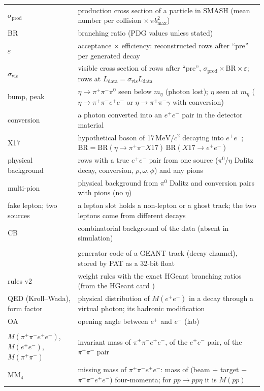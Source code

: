 \documentclass[11pt,a4paper]{article}
\newcommand{\pip}{\ensuremath{\pi^{+}}\xspace}
\newcommand{\pim}{\ensuremath{\pi^{-}}\xspace}
\newcommand{\piz}{\ensuremath{\pi^{0}}\xspace}
\newcommand{\ee}{\ensuremath{e^{+}e^{-}}\xspace}
\newcommand{\pipi}{\ensuremath{\pi^{+}\pi^{-}}\xspace}
\newcommand{\ppee}{\ensuremath{\pi^{+}\pi^{-}e^{+}e^{-}}\xspace}
\newcommand{\Mfour}{\ensuremath{M(\pi^{+}\pi^{-}e^{+}e^{-})}\xspace}
\newcommand{\Mee}{\ensuremath{M(e^{+}e^{-})}\xspace}
\newcommand{\Mpipi}{\ensuremath{M(\pi^{+}\pi^{-})}\xspace}
\newcommand{\MeVcc}{\ensuremath{\mathrm{MeV}/c^{2}}\xspace}
\newcommand{\Ldata}{\ensuremath{L_{\mathrm{data}}}\xspace}
\newcommand{\code}[1]{\texttt{\detokenize{#1}}}
\begin{document}
{\begin{longtable}{@{}>{\raggedright\arraybackslash}p{3.3cm} >{\raggedright\arraybackslash}p{\dimexpr\textwidth-3.3cm-2\tabcolsep\relax}@{}}
$\sigma_{\mathrm{prod}}$ & production cross section of a particle in SMASH (mean number per collision $\times\,\pi b_{\max}^2$) \\
BR & branching ratio (PDG values unless stated) \\
$\varepsilon$ & acceptance $\times$ efficiency: reconstructed rows after ``pre'' per generated decay \\
$\sigma_{\mathrm{vis}}$ & visible cross section of rows after ``pre'', $\sigma_{\mathrm{prod}}\times\mathrm{BR}\times\varepsilon$; rows at \Ldata $=\sigma_{\mathrm{vis}}\Ldata$ \\
bump, peak & $\eta\to\pipi\piz$ seen below $m_\eta$ (photon lost); $\eta$ seen at $m_\eta$ ($\eta\to\ppee$ or $\eta\to\pipi\gamma$ with conversion) \\
conversion & a photon converted into an \ee pair in the detector material \\
X17 & hypothetical boson of 17\,\MeVcc decaying into \ee; $\mathrm{BR} = \mathrm{BR}(\eta\to\pipi X17)\,\mathrm{BR}(X17\to\ee)$ \\
physical background & rows with a true \ee pair from one source (\piz/$\eta$ Dalitz decay, conversion, $\rho,\omega,\phi$) and any pions \\
multi-pion & physical background from \piz Dalitz and conversion pairs with pions (no $\eta$) \\
fake lepton; two sources & a lepton slot holds a non-lepton or a ghost track; the two leptons come from different decays \\
CB & combinatorial background of the data (absent in simulation) \\
\midrule
\multicolumn{2}{@{}l}{\textbf{Corrections}} \\
\code{geninfo} & generator code of a GEANT track (decay channel), stored by PAT as a 32-bit float \\
rules v2 & weight rules with the exact HGeant branching ratios (from the HGeant card \code{ETA}) \\
QED (Kroll--Wada), form factor & physical distribution of \Mee in a decay through a virtual photon; its hadronic modification \\
OA & opening angle between $e^+$ and $e^-$ (lab) \\
\midrule
\multicolumn{2}{@{}l}{\textbf{Kinematic variables and cuts}} \\
\Mfour, \Mee, \Mpipi & invariant mass of \ppee, of the \ee pair, of the \pipi pair \\
$\mathrm{MM}_4$ & missing mass of \ppee: mass of (beam + target $-$ \pip\pim$e^+e^-$) four-momenta; for $pp\to pp\eta$ it is $M(pp)$ \\

\end{longtable}}
\end{document}
